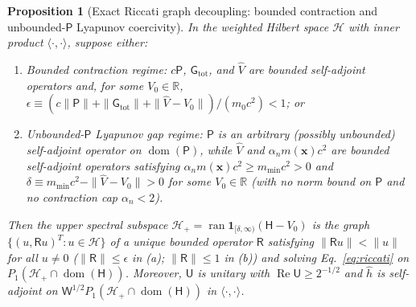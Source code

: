 \documentclass[aps,prd,onecolumn,tightenlines,nofootinbib,notitlepage,10pt,floatfix]{revtex4-2}
\theoremstyle{indentedtheorem}
\newtheorem{proposition}{Proposition}
\begin{document}
\begin{proposition}[Exact Riccati graph decoupling: bounded contraction and unbounded-$\mathsf{P}$ Lyapunov coercivity]\label{prop:riccati_existence}
In the weighted Hilbert space $\mathcal{H}$ with inner product $\langle\cdot,\cdot\rangle$, suppose either:
\begin{enumerate}[label=(\alph*)]
\item \emph{Bounded contraction regime:} $c\mathsf{P}$, $\mathsf{G}_\text{tot}$, and $\hat{V}$ are bounded self-adjoint operators and, for some $V_0\in\mathbb{R}$, $\epsilon\equiv(c\|\mathsf{P}\|+\|\mathsf{G}_\text{tot}\|+\|\hat{V}-V_0\|)/(m_0 c^2)<1$; or
\item \emph{Unbounded-$\mathsf{P}$ Lyapunov gap regime:} $\mathsf{P}$ is an arbitrary (possibly unbounded) self-adjoint operator on $\operatorname{dom}(\mathsf{P})$, while $\hat{V}$ and $\alpha_n m(\mathbf{x})c^2$ are bounded self-adjoint operators satisfying $\alpha_n m(\mathbf{x})c^2\ge m_{\min}c^2>0$ and $\delta\equiv m_{\min}c^2-\|\hat{V}-V_0\|>0$ for some $V_0\in\mathbb{R}$ (with no norm bound on $\mathsf{P}$ and no contraction cap $\alpha_n<2$).
\end{enumerate}
Then the upper spectral subspace $\mathcal{H}_+=\operatorname{ran}\mathbf{1}_{[\delta,\infty)}(\mathsf{H}-V_0)$ is the graph $\{(u,\mathsf{R}u)^T : u\in\mathcal{H}\}$ of a unique bounded operator $\mathsf{R}$ satisfying $\|\mathsf{R}u\|<\|u\|$ for all $u\neq 0$ ($\|\mathsf{R}\|\le\epsilon$ in (a); $\|\mathsf{R}\|\le 1$ in (b)) and solving Eq.~\eqref{eq:riccati} on $P_1(\mathcal{H}_+\cap\operatorname{dom}(\mathsf{H}))$. Moreover, $\mathsf{U}$ is unitary with $\operatorname{Re}\mathsf{U}\ge 2^{-1/2}$ and $\hat{h}$ is self-adjoint on $\mathsf{W}^{1/2}P_1(\mathcal{H}_+\cap\operatorname{dom}(\mathsf{H}))$ in $\langle\cdot,\cdot\rangle$.
\end{proposition}
\end{document}
